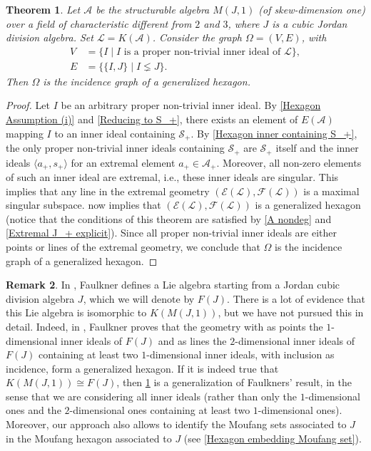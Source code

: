 \documentclass[oneside,a4paper]{amsart} %
\newtheorem{theorem}{Theorem}[section]
\theoremstyle{definition}
\newtheorem{remark}[theorem]{Remark}
\newcommand{\A}{\mathcal{A}}
\renewcommand{\SS}{\mathcal{S}}
\newcommand{\LL}{\mathcal{L}}
\newcommand{\E}{\mathcal{E}}
\newcommand{\F}{\mathcal{F}}
\newcommand{\dash}{\nobreakdash-\hspace{0pt}}
\numberwithin{equation}{section}
\begin{document}
\begin{theorem}
\label{Hexagon Main Theorem}
	Let $\A$ be the structurable algebra $M(J,1)$ (of skew-dimension one) over a field of characteristic different from $2$ and $3$, where $J$ is a cubic Jordan division algebra. 
	Set $\LL=K(\A)$. 
	Consider the graph $\Omega=(V,E)$, with
	\begin{align*}
	   V &= \{ I \mid I \text{ is a proper non-trivial inner ideal of $\LL$} \} , \\
	   E &= \{ \{ I,J \} \mid I \lneq J \} . 
	\end{align*}
	Then $\Omega$ is the incidence graph of a generalized hexagon.
\end{theorem}
\begin{proof}
	Let $I$ be an arbitrary proper non-trivial inner ideal. 
	By \cref{Hexagon Assumption (i)} and \cref{Reducing to S_+}, there exists an element of $E(\A)$ mapping $I$ to an inner ideal containing $\SS_+$. 
	By \cref{Hexagon inner containing S_+}, the only proper non-trivial inner ideals containing $\SS_+$ are $\SS_+$ itself and the inner ideals $\langle a_+,s_+\rangle$ for an extremal element $a_+\in\A_+$.
	Moreover, all non-zero elements of such an inner ideal are extremal, i.e., these inner ideals are singular.
	This implies that any line in the extremal geometry $(\E(\LL),\F(\LL))$ is a maximal singular subspace. 
	 now implies that $(\E(\LL),\F(\LL))$ is a generalized hexagon (notice that the conditions of this theorem are satisfied by \cref{A nondeg} and \cref{Extremal J_+ explicit}). 
	Since all proper non-trivial inner ideals are either points or lines of the extremal geometry, we conclude that $\Omega$ is the incidence graph of a generalized hexagon.
\end{proof}


\begin{remark}
\label{Remark Faulkner hexagon}
	In \cite[Chapter 11]{Faulkner1977}, Faulkner defines a Lie algebra starting from a Jordan cubic division algebra $J$, which we will denote by $F(J)$. 
	There is a lot of evidence that this Lie algebra is isomorphic to $K(M(J,1))$, but we have not pursued this in detail.
	Indeed, in \cite[Chapter 12]{Faulkner1977}, Faulkner proves that the geometry with as points the $1$\dash dimensional inner ideals of $F(J)$ and as lines the $2$\dash dimensional inner ideals of $F(J)$ containing at least two $1$\dash dimensional inner ideals, with inclusion as incidence, form a generalized hexagon. 
	If it is indeed true that $K(M(J,1))\cong F(J)$, then \cref{Hexagon Main Theorem} is a generalization of Faulkners' result, in the sense that we are considering all inner ideals (rather than only the $1$\dash dimensional ones and the $2$\dash dimensional ones containing at least two $1$\dash dimensional ones). 
	Moreover, our approach also allows to identify the Moufang sets associated to $J$ in the Moufang hexagon associated to $J$ (see \cref{Hexagon embedding Moufang set}).
\end{remark}
\end{document}
